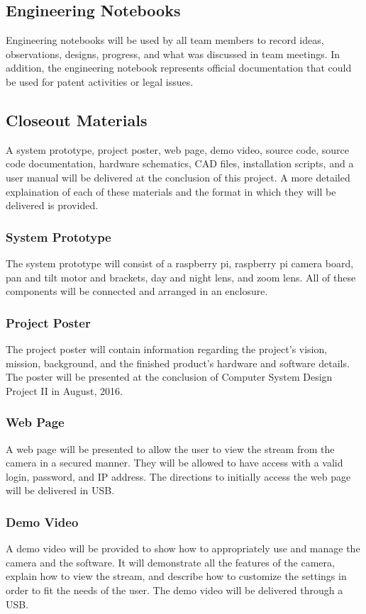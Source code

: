\subsection{Engineering Notebooks}
Engineering notebooks will be used by all team members to record ideas, observations, designs, progress, and what was discussed in team meetings. In addition, the engineering notebook represents official documentation that could be used for patent activities or legal issues. 

\subsection{Closeout Materials}
A system prototype, project poster, web page, demo video, source code, source code documentation, hardware schematics, CAD files, installation scripts, and a user manual will be delivered at the conclusion of this project. A more detailed 
explaination of each of these materials and the format in which they will be delivered is provided.

\subsubsection{System Prototype}
The system prototype will consist of a raspberry pi, raspberry pi camera board, pan and tilt motor and brackets, day and night lens, and zoom lens. All of these components will be connected and arranged in an enclosure. 

\subsubsection{Project Poster}
The project poster will contain information regarding the project’s vision, mission, background, and the finished product’s hardware and software details. The poster will be presented at the conclusion of Computer System Design Project II in August, 2016. 

\subsubsection{Web Page}
A web page will be presented to allow the user to view the stream from the camera in a secured manner. They will be allowed to have access with a valid login, password, and IP address. The directions to initially access the web page will be delivered in USB.

\subsubsection{Demo Video}
A demo video will be provided to show how to appropriately use and manage the camera and the software. It will demonstrate all the features of the camera, explain how to view the stream, and describe how to customize the settings in order to fit the needs of the user. The demo video will be delivered through a USB. 

